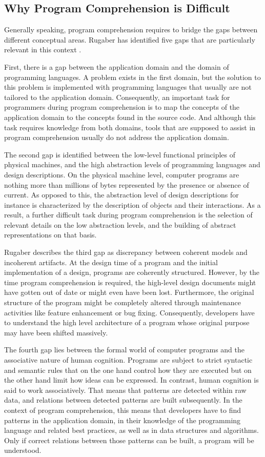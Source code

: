 \subsection{Why Program Comprehension is Difficult}
\label{ss:BackgroundComprehensionDifficulties}
Generally speaking, program comprehension requires to bridge the gaps between different conceptual areas.
Rugaber has identified five gaps that are particularly relevant in this context \cite{kent_program_1996}.

First, there is a gap between the application domain and the domain of programming languages.
A problem exists in the first domain, but the solution to this problem is implemented with programming languages that usually are not tailored to the application domain.
Consequently, an important task for programmers during program comprehension is to map the concepts of the application domain to the concepts found in the source code.
And although this task requires knowledge from both domains, tools that are supposed to assist in program comprehension usually do not address the application domain.

The second gap is identified between the low-level functional principles of physical machines, and the high abstraction levels of programming languages and design descriptions.
On the physical machine level, computer programs are nothing more than millions of bytes represented by the presence or absence of current.
As opposed to this, the abstraction level of design descriptions for instance is characterized by the description of objects and their interactions.
As a result, a further difficult task during program comprehension is the selection of relevant details on the low abstraction levels, and the building of abstract representations on that basis.

Rugaber describes the third gap as discrepancy between coherent models and incoherent artifacts.
At the design time of a program and the initial implementation of a design, programs are coherently structured.
However, by the time program comprehension is required, the high-level design documents might have gotten out of date or might even have been lost.
Furthermore, the original structure of the program might be completely altered through maintenance activities like feature enhancement or bug fixing.
Consequently, developers have to understand the high level architecture of a program whose original purpose may have been shifted massively.

The fourth gap lies between the formal world of computer programs and the associative nature of human cognition.
Programs are subject to strict syntactic and semantic rules that on the one hand control how they are executed but on the other hand limit how ideas can be expressed.
In contrast, human cognition is said to work associatively.
That means that patterns are detected within raw data, and relations between detected patterns are built subsequently.
In the context of program comprehension, this means that developers have to find patterns in the application domain, in their knowledge of the programming language and related best practices, as well as in data structures and algorithms.
Only if correct relations between those patterns can be built, a program will be understood.

